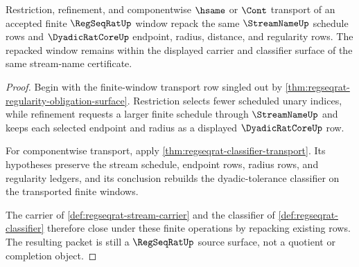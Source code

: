 \begin{theorem}
\label{thm:regseqrat-finite-window-transport-closure}
Restriction, refinement, and componentwise $\hsame$ or $\Cont$ transport of an accepted finite $\RegSeqRatUp$ window repack the same $\StreamNameUp$ schedule rows and $\DyadicRatCoreUp$ endpoint, radius, distance, and regularity rows. The repacked window remains within the displayed carrier and classifier surface of the same stream-name certificate.
\end{theorem}
\begin{proof}
Begin with the finite-window transport row singled out by \autoref{thm:regseqrat-regularity-obligation-surface}. Restriction selects fewer scheduled unary indices, while refinement requests a larger finite schedule through $\StreamNameUp$ and keeps each selected endpoint and radius as a displayed $\DyadicRatCoreUp$ row.

For componentwise transport, apply \autoref{thm:regseqrat-classifier-transport}. Its hypotheses preserve the stream schedule, endpoint rows, radius rows, and regularity ledgers, and its conclusion rebuilds the dyadic-tolerance classifier on the transported finite windows.

The carrier of \autoref{def:regseqrat-stream-carrier} and the classifier of \autoref{def:regseqrat-classifier} therefore close under these finite operations by repacking existing rows. The resulting packet is still a $\RegSeqRatUp$ source surface, not a quotient or completion object.
\end{proof}

